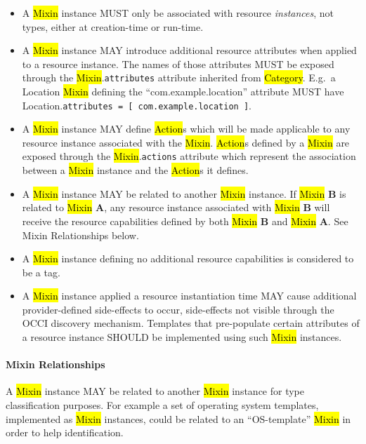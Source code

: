 \documentclass[10pt,a4paper]{article}
\begin{document}
\begin{itemize}
  \item A \hl{Mixin} instance MUST only be associated with resource
    {\em instances}, not types, either at creation-time or run-time.
  \item A \hl{Mixin} instance MAY introduce additional resource
    attributes when applied to a resource instance. The names of those
    attributes MUST be exposed through the \hl{Mixin}.{\tt attributes}
    attribute inherited from \hl{Category}.  E.g.~a Location
    \hl{Mixin} defining the ``com.example.location'' attribute MUST
    have Location.{\tt attributes = [ com.example.location ]}.
  \item A \hl{Mixin} instance MAY define \hl{Action}s which will be
    made applicable to any resource instance associated with the
    \hl{Mixin}.  \hl{Action}s defined by a \hl{Mixin} are exposed
    through the \hl{Mixin}.{\tt actions} attribute which represent the
    association between a \hl{Mixin} instance and the \hl{Action}s it
    defines.
  \item A \hl{Mixin} instance MAY be related to another \hl{Mixin}
    instance.  If \hl{Mixin} {\bf B} is related to \hl{Mixin} {\bf A},
    any resource instance associated with \hl{Mixin} {\bf B} will
    receive the resource capabilities defined by both \hl{Mixin} {\bf
      B} and \hl{Mixin} {\bf A}.  See Mixin Relationships below.
  \item A \hl{Mixin} instance defining no additional resource
    capabilities is considered to be a tag.
  \item A \hl{Mixin} instance applied a resource instantiation time
    MAY cause additional provider-defined side-effects to occur,
    side-effects not visible through the OCCI discovery
    mechanism. Templates that pre-populate certain attributes of a
    resource instance SHOULD be implemented using such \hl{Mixin}
    instances.
\end{itemize}

\paragraph*{Mixin Relationships}

A \hl{Mixin} instance MAY be related to another \hl{Mixin} instance
for type classification purposes. For example a set of operating
system templates, implemented as \hl{Mixin} instances, could be
related to an ``OS-template'' \hl{Mixin} in order to help
identification.
\end{document}
